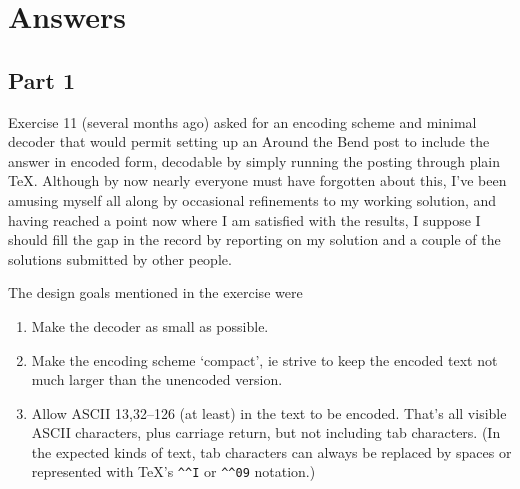 \begin{lcode}
ASCII 32--54,55--126: !"#$%
:;<=>?@ABCDEFGHIJKLMNOPQRSTUVWXYZ[\]^_`abcdefghijklmnopqrstuvwxyz{|}~
\end{lcode}

\section{Answers}

\begin{comment}
[The four parts of this answer were originally posted separately, as
indicated in the subject lines. Addendum 1 is the full text of Donald
Arseneau's solution, which appeared in abridged form in part 3. Also
addendum 2, containing a companion TeX encoder for my decoder, was not
posted.]

Date: 17 Aug 1994 16:24:12 -0400 (EDT)
From: Michael Downes <MJD@MATH.AMS.ORG>
Subject: Around the Bend #11, solutions, part 1 of 4
To: info-tex@shsu.edu
X-ListName: TeX-Related Network Discussion List <INFO-TeX@SHSU.edu>
\end{comment}

\subsection{Part 1}

Exercise 11 (several months ago) asked for an encoding scheme and
minimal decoder that would permit setting up an Around the Bend post
to include the answer in encoded form, decodable by simply running the
posting through plain TeX. Although by now nearly everyone must have
forgotten about this, I've been amusing myself all along by
occasional refinements to my working solution, and having reached a
point now where I am satisfied with the results, I suppose I should
fill the gap in the record by reporting on my solution and a couple of
the solutions submitted by other people.

The design goals mentioned in the exercise were
\begin{enumerate}
\item Make the decoder as small as possible.

\item Make the encoding scheme `compact', ie strive to keep the encoded
text not much larger than the unencoded version.

\item  Allow ASCII 13,32--126 (at least) in the text to be encoded. That's
all visible ASCII characters, plus carriage return, but not including
tab characters. (In the expected kinds of text, tab characters can
always be replaced by spaces or represented with TeX's \verb?^^I? or 
\verb?^^09? notation.)
\end{enumerate}

